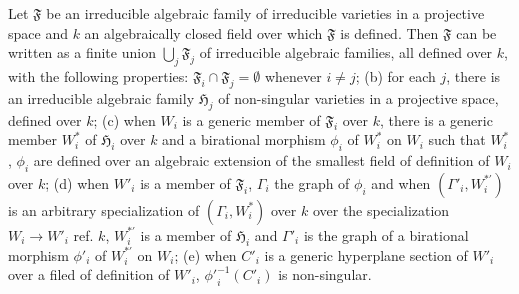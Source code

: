\begin{lemma}\label{art14-lem9}
Let $\mathfrak{F}$ be an irreducible algebraic family of irreducible varieties in a projective space and $k$ an algebraically closed field over which $\mathfrak{F}$ is defined. Then $\mathfrak{F}$ can be written as a finite union $\bigcup_{j}\mathfrak{F}_{j}$ of irreducible algebraic families, all defined over $k$, with the following properties: $\mathfrak{F}_{i}\cap \mathfrak{F}_{j}=\emptyset$ whenever $i\neq j$; {\rm(b)} for each $j$, there is an irreducible algebraic family $\mathfrak{H}_{j}$ of non-singular varieties in a projective space, defined over $k$; {\rm(c)} when $W_{i}$ is a generic member of $\mathfrak{F}_{i}$ over $k$, there is a generic member $W^{*}_{i}$ of $\mathfrak{H}_{i}$ over $k$ and a birational morphism $\phi_{i}$ of $W^{*}_{i}$ on $W_{i}$ such that $W^{*}_{i}$, $\phi_{i}$ are defined over an algebraic extension of the smallest field of definition of $W_{i}$ over $k$; {\rm(d)} when $W'_{i}$ is a member of $\mathfrak{F}_{i}$, $\Gamma_{i}$ the graph of $\phi_{i}$ and when $(\Gamma'_{i},W^{*'}_{i})$ is an arbitrary specialization of $(\Gamma_{i},W^{*}_{i})$ over $k$ over the specialization $W_{i}\to W'_{i}$ ref. $k$, $W^{*'}_{i}$ is a member of $\mathfrak{H}_{i}$ and $\Gamma'_{i}$ is the graph of a birational morphism $\phi'_{i}$ of $W^{*'}_{i}$ on $W_{i}$; {\rm(e)} when $C'_{i}$ is a generic hyperplane section of $W'_{i}$ over a filed of definition of $W'_{i}$, ${\phi'}^{-1}_{i}(C'_{i})$ is non-singular.
\end{lemma}


